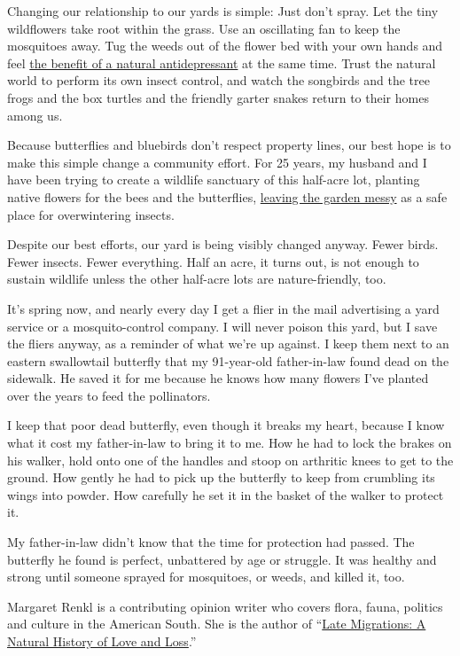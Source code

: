 Changing our relationship to our yards is simple: Just don't spray. Let
the tiny wildflowers take root within the grass. Use an oscillating fan
to keep the mosquitoes away. Tug the weeds out of the flower bed with
your own hands and feel
\href{https://www.medicalnewstoday.com/articles/66840\#_blank}{the
benefit of a natural antidepressant} at the same time. Trust the natural
world to perform its own insect control, and watch the songbirds and the
tree frogs and the box turtles and the friendly garter snakes return to
their homes among us.

Because butterflies and bluebirds don't respect property lines, our best
hope is to make this simple change a community effort. For 25 years, my
husband and I have been trying to create a wildlife sanctuary of this
half-acre lot, planting native flowers for the bees and the butterflies,
\href{https://www.nytimes3xbfgragh.onion/2018/02/10/opinion/sunday/let-your-winter-garden-go-wild.html}{leaving
the garden messy} as a safe place for overwintering insects.

Despite our best efforts, our yard is being visibly changed anyway.
Fewer birds. Fewer insects. Fewer everything. Half an acre, it turns
out, is not enough to sustain wildlife unless the other half-acre lots
are nature-friendly, too.

It's spring now, and nearly every day I get a flier in the mail
advertising a yard service or a mosquito-control company. I will never
poison this yard, but I save the fliers anyway, as a reminder of what
we're up against. I keep them next to an eastern swallowtail butterfly
that my 91-year-old father-in-law found dead on the sidewalk. He saved
it for me because he knows how many flowers I've planted over the years
to feed the pollinators.

I keep that poor dead butterfly, even though it breaks my heart, because
I know what it cost my father-in-law to bring it to me. How he had to
lock the brakes on his walker, hold onto one of the handles and stoop on
arthritic knees to get to the ground. How gently he had to pick up the
butterfly to keep from crumbling its wings into powder. How carefully he
set it in the basket of the walker to protect it.

My father-in-law didn't know that the time for protection had passed.
The butterfly he found is perfect, unbattered by age or struggle. It was
healthy and strong until someone sprayed for mosquitoes, or weeds, and
killed it, too.

Margaret Renkl is a contributing opinion writer who covers flora, fauna,
politics and culture in the American South. She is the author of
``\href{https://milkweed.org/book/late-migrations}{Late Migrations: A
Natural History of Love and Loss}.''


